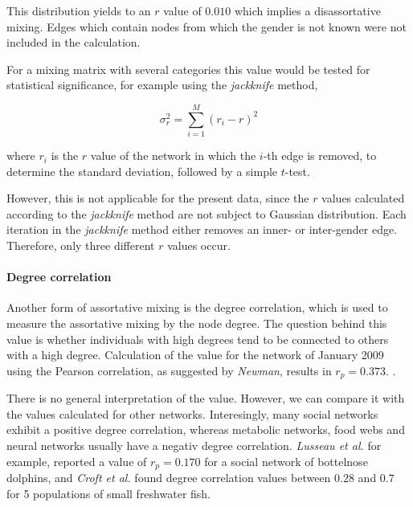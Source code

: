 This distribution yields to an $r$ value of $0.010$ which implies a disassortative mixing. Edges which contain nodes from which the gender is not known were not included in the calculation.

For a mixing matrix with several categories this value would be tested for statistical significance, for example using the \textit{jackknife}\citep{newman:03} method,  

\begin{equation}
\sigma_r^2 = \sum_{i=1}^M(r_i -r)^2
\label{eq:ass_coeff_gender}
\end{equation}  

where $r_i$ is the $r$ value of the network in which the $i$-th edge is removed, to determine the standard deviation, followed by a simple $t$-test\citep{snijders:99}.

However, this is not applicable for the present data, since the $r$ values calculated according to the \textit{jackknife} method are not subject to Gaussian distribution. Each iteration in the \textit{jackknife} method either removes an inner- or inter-gender edge. Therefore, only three different $r$ values occur.

\paragraph{Degree correlation}
\label{para:degree_corr}
 
Another form of assortative mixing is the degree correlation, which is used to measure the assortative mixing by the node degree. The question behind this value is whether individuals with high degrees tend to be connected to others with a high degree\citep{croft:07}. Calculation of the value for the network of January 2009 using the Pearson correlation, as suggested by \textit{Newman}\citep{newman:02}, results in $r_p = 0.373$. \citep{newman:03a}. 

There is no general interpretation of the value. However, we can compare it with the values calculated for other networks. Interesingly, many social networks exhibit a positive degree correlation, whereas metabolic networks, food webs and neural networks usually have a negativ degree correlation\citep{newman:03a}. \textit{Lusseau et al.}\citep{lusseau:06} for example, reported a value of $r_p = 0.170$ for a social network of bottelnose dolphins, and \textit{Croft et al.}\citep{croft:05} found degree correlation values between $0.28$ and $0.7$ for 5 populations of small freshwater fish.   
 
